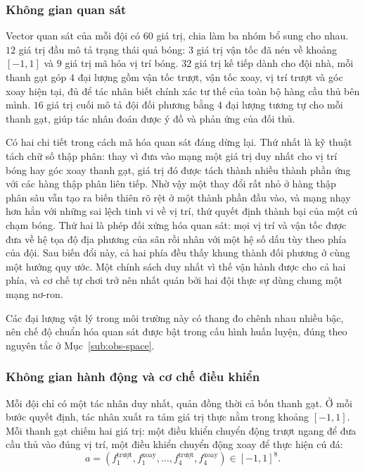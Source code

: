 \subsubsection{Không gian quan sát}
\label{sub:football-obs}
\indent Vector quan sát của mỗi đội có $60$ giá trị, chia làm ba nhóm bổ sung cho
nhau. $12$ giá trị đầu mô tả trạng thái quả bóng: $3$ giá trị vận tốc đã nén về khoảng
$[-1,1]$ và $9$ giá trị mã hóa vị trí bóng. $32$ giá trị kế tiếp dành cho đội nhà, mỗi thanh
gạt góp $4$ đại lượng gồm vận tốc trượt, vận tốc xoay, vị trí trượt và góc
xoay hiện tại, đủ để tác nhân biết chính xác tư thế của toàn bộ hàng cầu thủ bên mình.
$16$ giá trị cuối mô tả đội đối phương bằng $4$ đại lượng tương tự cho mỗi thanh gạt,
giúp tác nhân đoán được ý đồ và phản ứng của đối thủ.

\indent Có hai chi tiết trong cách mã hóa quan sát đáng dừng lại. Thứ nhất là kỹ thuật
tách chữ số thập phân: thay vì đưa vào mạng một giá trị duy nhất cho vị trí bóng hay góc
xoay thanh gạt, giá trị đó được tách thành nhiều thành phần ứng với các hàng thập phân
liên tiếp. Nhờ vậy một thay đổi rất nhỏ ở hàng thập phân sâu vẫn tạo ra biến thiên rõ rệt
ở một thành phần đầu vào, và mạng nhạy hơn hẳn với những sai lệch tinh vi về vị trí, thứ
quyết định thành bại của một cú chạm bóng. Thứ hai là phép đối xứng hóa quan sát: mọi vị
trí và vận tốc được đưa về hệ tọa độ địa phương của sân rồi nhân với một hệ số dấu tùy
theo phía của đội. Sau biến đổi này, cả hai phía đều thấy khung thành đối phương ở cùng
một hướng quy ước. Một chính sách duy nhất vì thế vận hành được cho cả hai phía, và cơ chế
tự chơi trở nên nhất quán bởi hai đội thực sự dùng chung một mạng nơ-ron.

\indent Các đại lượng vật lý trong môi trường này có thang đo chênh nhau nhiều bậc, nên
chế độ chuẩn hóa quan sát được bật trong cấu hình huấn luyện, đúng theo nguyên tắc ở
Mục~\ref{sub:obs-space}.

\subsubsection{Không gian hành động và cơ chế điều khiển}
\indent Mỗi đội chỉ có một tác nhân duy nhất, quản đồng thời cả bốn thanh gạt. Ở mỗi bước
quyết định, tác nhân xuất ra tám giá trị thực nằm trong khoảng $[-1,1]$. Mỗi thanh gạt
chiếm hai giá trị: một điều khiển chuyển động trượt ngang để đưa cầu thủ vào đúng vị trí,
một điều khiển chuyển động xoay để thực hiện cú đá:
\begin{equation}
a = (f^{\text{trượt}}_1, f^{\text{xoay}}_1, \dots, f^{\text{trượt}}_4, f^{\text{xoay}}_4)
\in [-1, 1]^8 .
\end{equation}

